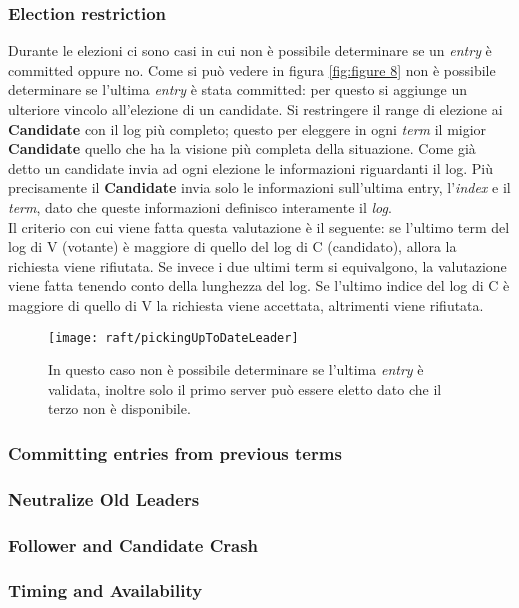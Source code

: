   \subsubsection{Election restriction}
  Durante le elezioni ci sono casi in cui non è possibile determinare se un \textit{entry} è committed oppure no.
  Come si può vedere in figura \ref{fig:figure 8} non è possibile determinare se l'ultima \textit{entry} è stata committed: per questo si aggiunge un ulteriore vincolo all'elezione di un candidate.
  Si restringere il range di elezione ai \textbf{Candidate} con il log più completo; questo per eleggere in ogni \textit{term} il migior \textbf{Candidate} quello che ha la visione più completa della situazione. 
  Come già detto un candidate invia ad ogni elezione le informazioni riguardanti il log.
  Più precisamente il \textbf{Candidate} invia solo le informazioni sull'ultima entry, l'\textit{index} e il \textit{term}, dato che queste informazioni definisco interamente il \textit{log}.
  \\
  Il criterio con cui viene fatta questa valutazione è il seguente: se l'ultimo term del log di V (votante) è maggiore di quello del log di C (candidato), allora la  richiesta viene rifiutata. Se invece i due ultimi term si equivalgono, la valutazione viene fatta tenendo conto della lunghezza del log. Se l'ultimo indice del log di C è maggiore di quello di V la richiesta viene accettata, altrimenti viene rifiutata.
  	
  \begin{figure}[H]
  	\centering
  	\texttt{[image: raft/pickingUpToDateLeader]}
  	\captionsetup{singlelinecheck=off}
  	\caption[stateDiagramCaption]{
	In questo caso non è possibile determinare se l'ultima \textit{entry} è validata, inoltre solo il primo server può essere eletto dato che il terzo non è disponibile.}
  	\label{fig:figure8}
  \end{figure}
  \subsubsection{Committing entries from previous terms}
  \subsubsection{Neutralize Old Leaders}
  \subsubsection{Follower and Candidate Crash}
  \subsubsection{Timing and Availability}
